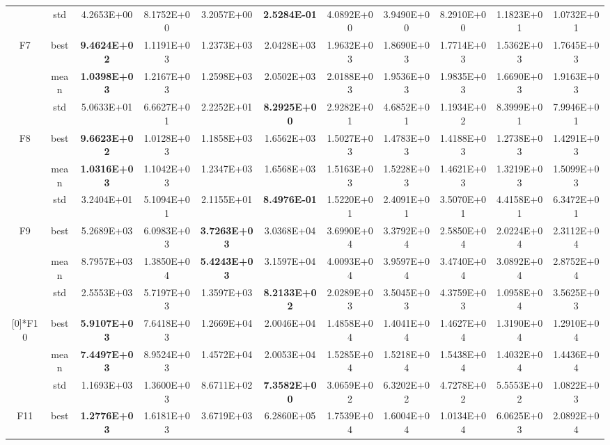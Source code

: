 \documentclass{wzuthesis}
\begin{document}
\begin{longtable}{ccccccccccc}
          & std   & 4.2653E+00 & 8.1752E+00 & 3.2057E+00 & \textbf{2.5284E-01} & 4.0892E+00 & 3.9490E+00 & 8.2910E+00 & 1.1823E+01 & 1.0732E+01 \\
\multirow{3}[0]{*}{F7} & best  & \textbf{9.4624E+02} & 1.1191E+03 & 1.2373E+03 & 2.0428E+03 & 1.9632E+03 & 1.8690E+03 & 1.7714E+03 & 1.5362E+03 & 1.7645E+03 \\
          & mean  & \textbf{1.0398E+03} & 1.2167E+03 & 1.2598E+03 & 2.0502E+03 & 2.0188E+03 & 1.9536E+03 & 1.9835E+03 & 1.6690E+03 & 1.9163E+03 \\
          & std   & 5.0633E+01 & 6.6627E+01 & 2.2252E+01 & \textbf{8.2925E+00} & 2.9282E+01 & 4.6852E+01 & 1.1934E+02 & 8.3999E+01 & 7.9946E+01 \\
\multirow{3}[0]{*}{F8} & best  & \textbf{9.6623E+02} & 1.0128E+03 & 1.1858E+03 & 1.6562E+03 & 1.5027E+03 & 1.4783E+03 & 1.4188E+03 & 1.2738E+03 & 1.4291E+03 \\
          & mean  & \textbf{1.0316E+03} & 1.1042E+03 & 1.2347E+03 & 1.6568E+03 & 1.5163E+03 & 1.5228E+03 & 1.4621E+03 & 1.3219E+03 & 1.5099E+03 \\
          & std   & 3.2404E+01 & 5.1094E+01 & 2.1155E+01 & \textbf{8.4976E-01} & 1.5220E+01 & 2.4091E+01 & 3.5070E+01 & 4.4158E+01 & 6.3472E+01 \\
\multirow{3}[0]{*}{F9} & best  & 5.2689E+03 & 6.0983E+03 & \textbf{3.7263E+03} & 3.0368E+04 & 3.6990E+04 & 3.3792E+04 & 2.5850E+04 & 2.0224E+04 & 2.3112E+04 \\
          & mean  & 8.7957E+03 & 1.3850E+04 & \textbf{5.4243E+03} & 3.1597E+04 & 4.0093E+04 & 3.9597E+04 & 3.4740E+04 & 3.0892E+04 & 2.8752E+04 \\
          & std   & 2.5553E+03 & 5.7197E+03 & 1.3597E+03 & \textbf{8.2133E+02} & 2.0289E+03 & 3.5045E+03 & 4.3759E+03 & 1.0958E+04 & 3.5625E+03 \\
          \vspace*{1\baselineskip} 
\multirow{3}[0]{*}{F10} & best  & \textbf{5.9107E+03} & 7.6418E+03 & 1.2669E+04 & 2.0046E+04 & 1.4858E+04 & 1.4041E+04 & 1.4627E+04 & 1.3190E+04 & 1.2910E+04 \\
          & mean  & \textbf{7.4497E+03} & 8.9524E+03 & 1.4572E+04 & 2.0053E+04 & 1.5285E+04 & 1.5218E+04 & 1.5438E+04 & 1.4032E+04 & 1.4436E+04 \\
          & std   & 1.1693E+03 & 1.3600E+03 & 8.6711E+02 & \textbf{7.3582E+00} & 3.0659E+02 & 6.3202E+02 & 4.7278E+02 & 5.5553E+02 & 1.0822E+03 \\
\multirow{3}[0]{*}{F11} & best  & \textbf{1.2776E+03} & 1.6181E+03 & 3.6719E+03 & 6.2860E+05 & 1.7539E+04 & 1.6004E+04 & 1.0134E+04 & 6.0625E+03 & 2.0892E+04 \\

\end{longtable}
\end{document}
